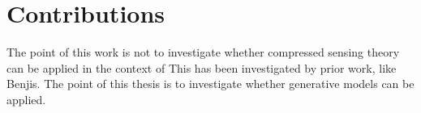 




\section{Contributions}
The point of this work is not to investigate whether compressed sensing theory can be applied in the context of 
This has been investigated by prior work, like Benjis.
The point of this thesis is to investigate whether generative models can be applied.

